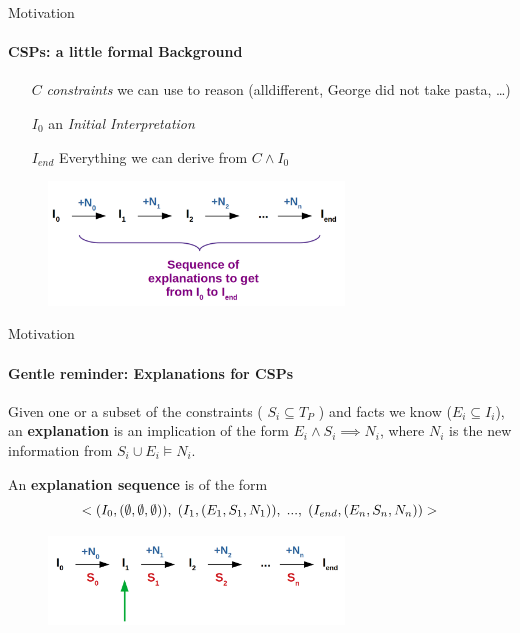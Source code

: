 \documentclass{beamer}
\newcommand\m[1]{\ensuremath{#1}\xspace}
\begin{document}
\begin{frame}{Motivation}
	\framesubtitle{CSPs: a little formal Background}
	
	\begin{itemize}
		\item[$\m{C}$] \emph{constraints} we can use to reason (alldifferent, George did not take pasta, …)
		\item[$I_0$] an \emph{Initial Interpretation}
		\item[$I_{end}$] Everything we can derive from $ \m{C} \wedge \m{I}_0$
	\end{itemize}
\begin{figure}
	\includegraphics[width=0.7\textwidth]{sequence_explanation.png}
\end{figure}
\end{frame}



\begin{frame}{Motivation}
	\framesubtitle{Gentle reminder: Explanations for CSPs}
	 \begin{definition}
		Given one or a subset of the constraints ( $S_i \subseteq T_P$  ) and facts we know ($E_i\subseteq I_i$), an \textbf{explanation} is an implication of the form $E_i \wedge S_i  \implies N_i $, where $N_i$ is the new information from $S_i \cup E_i \models N_i$.
	\end{definition}

An \textbf{explanation sequence} is of the form $$<(I_0,(\emptyset,\emptyset,\emptyset)),\text{\hspace{3pt}}(I_1,(E_1, S_1, N_1)),\text{\hspace{3pt}}...,\text{\hspace{3pt}}(I_{end},(E_{n}, S_n, N_n ))>$$

\begin{figure}
	\includegraphics[width=0.7\textwidth]{sequence_explanation2.png}
\end{figure}


\end{frame}
\end{document}
